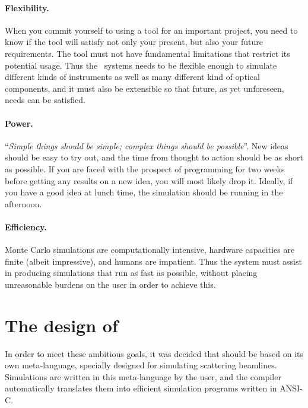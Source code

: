 \paragraph{Flexibility.}
When you commit yourself to using a tool for an important project, you
need to know if the tool will satisfy not only your present, but also
your future requirements. The tool must not have fundamental limitations that
restrict its potential usage. Thus the \MCX\ systems needs to be
flexible enough to simulate different kinds of instruments
as well as many different kind of
optical components, and it must also be extensible so that future, as
yet unforeseen, needs can be satisfied.
%
\paragraph{Power.}
``\textit{Simple things should be simple; complex things should be possible}''.
New ideas should be easy to try out, and the time from thought to action
should be as short as possible. If you are faced with the prospect of programming for
two weeks before getting any results on a new idea, you will most likely drop
it. Ideally, if you have a good idea at lunch time, the simulation
should be running in the afternoon.
%
\paragraph{Efficiency.}
Monte Carlo simulations are computationally intensive, hardware capacities
are finite (albeit impressive), and humans are impatient. Thus the
system must assist in producing simulations that run as fast as
possible, without placing unreasonable burdens on the user in order to
achieve this.


\section{The design of \MCX}
\label{s:design}

In order to meet these ambitious goals, it was decided that \MCX should
be based on its own meta-language, specially designed for
simulating scattering beamlines. Simulations are written in
this meta-language by the user, and the \MCX compiler automatically
translates them into efficient simulation programs written in ANSI-C.

